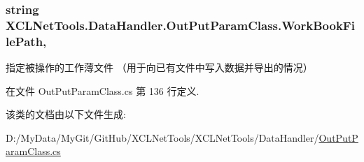 \hypertarget{class_x_c_l_net_tools_1_1_data_handler_1_1_out_put_param_class_ac24509285a5c4a9bec38099e2070aeba}{
\subsubsection[{Work\-Book\-File\-Path}]{\setlength{\rightskip}{0pt plus 5cm}string X\-C\-L\-Net\-Tools.\-Data\-Handler.\-Out\-Put\-Param\-Class.\-Work\-Book\-File\-Path\hspace{0.3cm}{\ttfamily [get]}, {\ttfamily [set]}}}\label{class_x_c_l_net_tools_1_1_data_handler_1_1_out_put_param_class_ac24509285a5c4a9bec38099e2070aeba}


指定被操作的工作薄文件 （用于向已有文件中写入数据并导出的情况） 



在文件 Out\-Put\-Param\-Class.\-cs 第 136 行定义.



该类的文档由以下文件生成\-:\begin{DoxyCompactItemize}
\item 
D\-:/\-My\-Data/\-My\-Git/\-Git\-Hub/\-X\-C\-L\-Net\-Tools/\-X\-C\-L\-Net\-Tools/\-Data\-Handler/\hyperlink{_out_put_param_class_8cs}{Out\-Put\-Param\-Class.\-cs}\end{DoxyCompactItemize}
